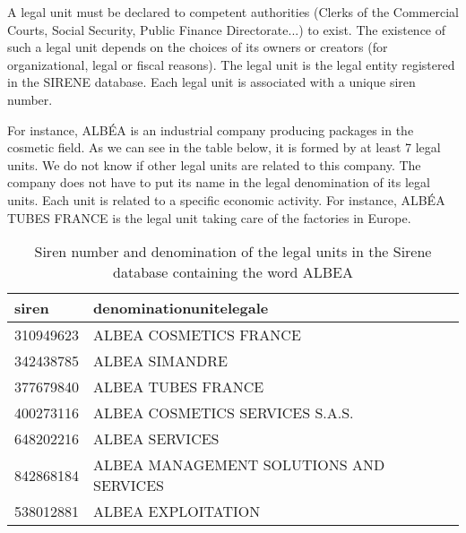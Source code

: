 \documentclass[AEJ]{AEA}
\begin{document}
A legal unit must be declared to competent authorities (Clerks of the Commercial Courts, Social Security, Public Finance Directorate...) to exist.
The existence of such a legal unit depends on the choices of its owners or creators 
(for organizational, legal or fiscal reasons).
The legal unit is the legal entity registered in the SIRENE database. 
Each legal unit is associated with a unique siren number.\newline

For instance, ALBÉA is an industrial company producing packages in the cosmetic field.
As we can see in the table below, it is formed by at least 7 legal units. We do not know if other legal units are
related to this company. The company does not have to put its name in the
legal denomination of its legal units. Each unit is related to a specific economic activity.
For instance, ALBÉA TUBES FRANCE is the legal unit taking care of the factories in Europe.
\begin{table}
    \begin{tabular}{l|l}
        \hline
        siren & denominationunitelegale \\
        \hline
        310949623 & ALBEA COSMETICS FRANCE \\
        \hline
        342438785 & ALBEA SIMANDRE \\
        \hline
        377679840 & ALBEA TUBES FRANCE \\
        \hline
        400273116 & ALBEA COSMETICS SERVICES S.A.S. \\
        \hline
        648202216 & ALBEA SERVICES \\
        \hline
        842868184 & ALBEA MANAGEMENT SOLUTIONS AND SERVICES \\
        \hline
        538012881 & ALBEA EXPLOITATION \\
        \hline
    \end{tabular}
    \caption{Siren number and denomination of the legal units in the Sirene database containing the word ALBEA}
\end{table}
\end{document}
